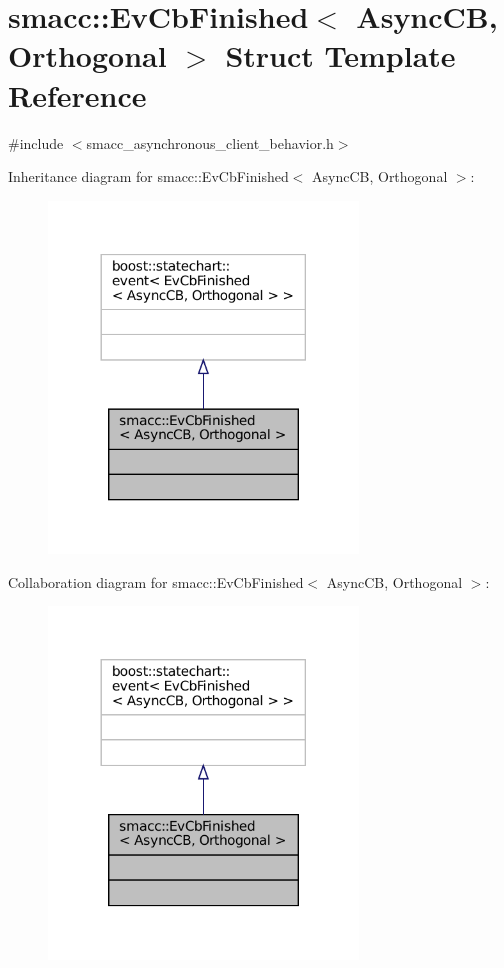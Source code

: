 \hypertarget{structsmacc_1_1EvCbFinished}{}\section{smacc\+:\+:Ev\+Cb\+Finished$<$ Async\+CB, Orthogonal $>$ Struct Template Reference}
\label{structsmacc_1_1EvCbFinished}


{\ttfamily \#include $<$smacc\+\_\+asynchronous\+\_\+client\+\_\+behavior.\+h$>$}



Inheritance diagram for smacc\+:\+:Ev\+Cb\+Finished$<$ Async\+CB, Orthogonal $>$\+:
\nopagebreak
\begin{figure}[H]
\begin{center}
\leavevmode
\includegraphics[width=233pt]{structsmacc_1_1EvCbFinished__inherit__graph}
\end{center}
\end{figure}


Collaboration diagram for smacc\+:\+:Ev\+Cb\+Finished$<$ Async\+CB, Orthogonal $>$\+:
\nopagebreak
\begin{figure}[H]
\begin{center}
\leavevmode
\includegraphics[width=233pt]{structsmacc_1_1EvCbFinished__coll__graph}
\end{center}
\end{figure}


